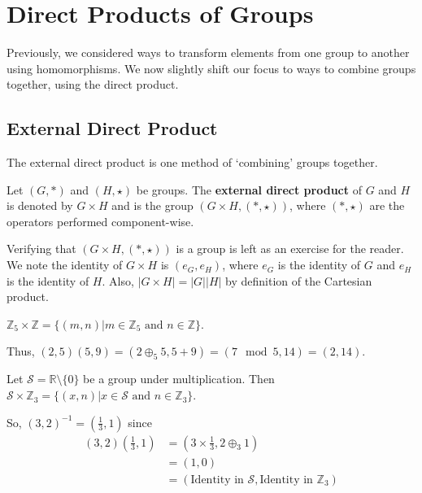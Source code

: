 \chapter{Direct Products of Groups}
Previously, we considered ways to transform elements from one group to another using homomorphisms. We now slightly shift our focus to ways to combine groups together, using the direct product.

\section{External Direct Product}
The external direct product is one method of `combining' groups together.
\begin{definition}
    Let $(G, \ast)$ and $(H, \star)$ be groups. The \textbf{external direct product} of $G$ and $H$ is denoted by $G\times H$ and is the group $(G\times H, (\ast, \star))$, where $(\ast, \star)$ are the operators performed component-wise.
\end{definition}
Verifying that $(G\times H, (\ast, \star))$ is a group is left as an exercise for the reader. We note the identity of $G \times H$ is $(e_G, e_H)$, where $e_G$ is the identity of $G$ and $e_H$ is the identity of $H$. Also, $|G \times H| = |G||H|$ by definition of the Cartesian product.

\begin{example}
    $\mathbb{Z}_5 \times \mathbb{Z} = \{(m,n) \vert m \in \mathbb{Z}_5 \text{ and } n \in \mathbb{Z}\}$.

    Thus, $(2, 5)(5, 9) = (2 \oplus_5 5, 5 + 9) = (7 \mod 5, 14) = (2, 14)$.
\end{example}

\begin{example}
    Let $\mathcal{S} = \mathbb{R}\setminus\{0\}$ be a group under multiplication. Then $\mathcal{S} \times \mathbb{Z}_3 = \{ (x, n) \vert x \in \mathcal{S} \text{ and } n \in \mathbb{Z}_3\}$.

    So, $(3, 2)^{-1} = \left(\frac13, 1\right)$ since
    \begin{align*}
        (3, 2)\left(\frac13, 1\right) &= \left(3 \times \frac13, 2 \oplus_3 1\right)\\
        &= (1, 0)\\
        &= (\text{Identity in }\mathcal{S}, \text{Identity in }\mathbb{Z}_3)
    \end{align*}
\end{example}

